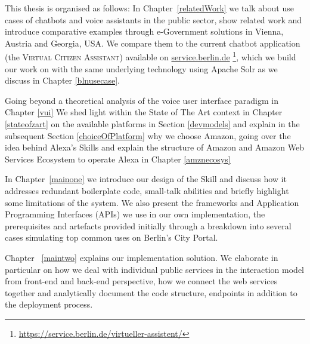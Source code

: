 This thesis is organised as follows:
In Chapter~\ref{relatedWork} %
we talk about use cases of chatbots and voice assistants in the public sector, 
show related work 
and introduce comparative examples
through e-Government solutions in
Vienna, Austria and Georgia, USA.
We compare them to the current chatbot application (the \textsc{Virtual Citizen Assistant}) available on \href{https://service.berlin.de/virtueller-assistent/virtueller-assistent-606279.php}{service.berlin.de} \footnote{\url{https://service.berlin.de/virtueller-assistent/}}, which we build our work on with the same underlying technology using Apache Solr as we discuss in Chapter \ref{blnusecase}.

%

Going beyond a theoretical analysis of the voice user interface paradigm in 
	Chapter 
\ref{vui}
We shed light within the State of The Art context in 
Chapter 
\ref{stateofzart} 
on the available platforms in Section \ref{devmodels} and explain in the subsequent Section \ref{choiceOfPlatform} why we choose Amazon, going over the idea behind Alexa's Skills
and explain the structure of Amazon and Amazon Web Services Ecosystem to operate Alexa in %
Chapter 
\ref{amznecosys}

%
%
%
%
%


In Chapter~\ref{mainone} we introduce our design of the Skill and discuss how it 
addresses
redundant boilerplate code, small-talk abilities and briefly highlight some limitations of the system. We also present the frameworks 
	and Application Programming Interfaces (APIs)
 we use in our own implementation, the prerequisites and artefacts provided initially through a breakdown into several cases simulating top common uses on Berlin's City Portal. %


Chapter ~\ref{maintwo} 
explains our implementation solution. We elaborate in particular on how we deal with individual public services in the interaction model from front-end and back-end perspective, how we connect the web services together and analytically document the code structure, endpoints in addition to the deployment process.

